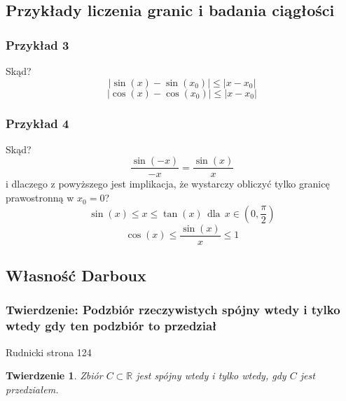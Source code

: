 \documentclass{article}
\newtheorem*{theorem}{Twierdzenie}
\begin{document}
\subsection{Przykłady liczenia granic i badania ciągłości}
\subsubsection{Przykład 3}
Skąd?
\begin{equation*}
    |\sin(x) - \sin(x_0)| \leq |x - x_0|
\end{equation*}
\begin{equation*}
    |\cos(x) - \cos(x_0)| \leq |x - x_0|
\end{equation*}

\subsubsection{Przykład 4}
Skąd?
\begin{equation*}
    \frac{\sin(-x)}{-x} = \frac{\sin(x)}{x}
\end{equation*}
i dlaczego z powyższego jest implikacja, że wystarczy obliczyć tylko granicę prawostronną w \(x_0 = 0\)?
\begin{equation*}
    \sin(x) \leq x \leq \tan(x) \ \ \mbox{dla} \ \ x \in (0, \frac{\pi}{2})
\end{equation*}
\begin{equation*}
    \cos(x) \leq \frac{\sin(x)}{x} \leq 1
\end{equation*}

\subsection{Własność Darboux}

\subsubsection{Twierdzenie: Podzbiór rzeczywistych spójny wtedy i tylko wtedy gdy ten podzbiór to przedział}
Rudnicki strona 124
\begin{theorem}
    Zbiór \(C \subset \mathbb{R}\) jest spójny wtedy i tylko wtedy, gdy \(C\) jest przedziałem.
\end{theorem}
\end{document}
